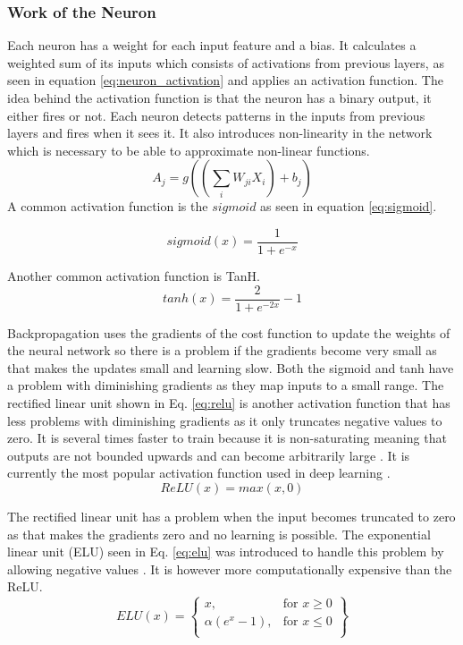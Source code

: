 \documentclass{kththesis}
\begin{document}
\subsubsection{Work of the Neuron}
Each neuron  has a weight for each input feature and a bias. It calculates a weighted sum of its inputs which consists of activations from previous layers, as seen in equation \ref{eq:neuron_activation} and applies an activation function. The idea behind the activation function is that the neuron has a binary output, it either fires or  not. Each neuron detects  patterns  in the inputs from previous layers and fires when it sees it.  It  also introduces non-linearity in the network which is necessary to be able to approximate non-linear functions.
\begin{equation}
\label{eq:neuron_activation}
A_{j}=g((\sum_{i}W_{ji}X_{i})+b_j)
\end{equation}
A common activation function is the $sigmoid$ as seen in equation \ref{eq:sigmoid}. 

\begin{equation}
\label{eq:sigmoid}
sigmoid(x)=\frac{1}{1+e^{-x}}
\end{equation}

Another common activation function is TanH.
\begin{equation}
\label{eq:tanh}
tanh(x)=\frac{2}{1+e^{-2x}}-1
\end{equation}

Backpropagation uses the gradients of the cost function to update the weights of the neural network so there is a problem if the gradients become very small as that makes the updates small and learning slow. Both the sigmoid and tanh have a problem with diminishing gradients as they map inputs to a small range. The rectified linear unit shown in Eq. \ref{eq:relu} is another activation function that has less problems with diminishing gradients as it only truncates negative values to zero.  It is several times faster to train because it is non-saturating meaning that outputs are not bounded upwards and can become arbitrarily large \cite{krizhevsky2012imagenet}. It is currently the most popular activation function used  in deep learning \cite{lecun2015deep}.
\begin{equation}
\label{eq:relu}
ReLU(x)=max(x,0)
\end{equation}

The rectified linear unit has a problem when the input becomes truncated to zero as that makes the gradients zero and no learning is possible. The exponential linear unit (ELU) seen in Eq. \ref{eq:elu} was introduced to handle this problem by allowing negative values \cite{DBLP:journals/corr/ClevertUH15}. It is however more computationally expensive than the ReLU.
\begin{equation}
\label{eq:elu}
ELU(x) = \left\{\begin{array}{lr}
        x, & \text{for } x\geq0\\
        \alpha(e^x-1), & \text{for } x\le 0\\
        \end{array}\right\}
\end{equation}
\end{document}
